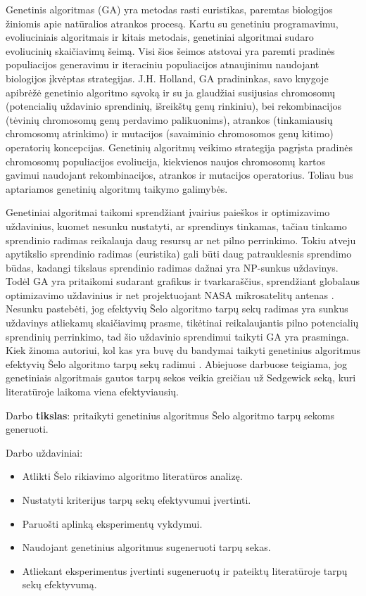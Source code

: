 \documentclass{VUMIFInfKursinis}
\begin{document}
Genetinis algoritmas (GA) yra metodas rasti euristikas, paremtas biologijos žiniomis apie natūralios atrankos procesą.
Kartu su genetiniu programavimu, evoliuciniais algoritmais ir kitais metodais, %
genetiniai algoritmai sudaro evoliucinių skaičiavimų šeimą.
Visi šios šeimos atstovai yra paremti pradinės populiacijos generavimu ir iteraciniu populiacijos atnaujinimu naudojant biologijos įkvėptas strategijas.
J.H. Holland, GA pradininkas, savo knygoje \cite{holland1992adaptation}
apibrėžė genetinio algoritmo sąvoką ir su ja glaudžiai susijusias
chromosomų (potencialių uždavinio sprendinių, išreikštų genų rinkiniu), bei
rekombinacijos (tėvinių chromosomų genų perdavimo palikuonims),
atrankos (tinkamiausių chromosomų atrinkimo) ir mutacijos (savaiminio chromosomos genų kitimo) operatorių koncepcijas.
Genetinių algoritmų veikimo strategija pagrįsta pradinės chromosomų populiacijos evoliucija, kiekvienos naujos chromosomų kartos
gavimui naudojant rekombinacijos, atrankos ir mutacijos operatorius.
Toliau bus aptariamos genetinių algoritmų taikymo galimybės.

Genetiniai algoritmai taikomi sprendžiant įvairius paieškos ir optimizavimo uždavinius, kuomet nesunku nustatyti, ar sprendinys tinkamas,
tačiau tinkamo sprendinio radimas reikalauja daug resursų ar net pilno perrinkimo.
Tokiu atveju apytikslio sprendinio radimas (euristika) gali būti daug patrauklesnis sprendimo būdas,
kadangi tikslaus sprendinio radimas dažnai yra NP-sunkus uždavinys.
Todėl GA yra pritaikomi sudarant grafikus ir tvarkaraščius,
sprendžiant globalaus optimizavimo uždavinius
ir net projektuojant NASA mikrosatelitų antenas \cite{hornby2006automated}.
Nesunku pastebėti, jog efektyvių Šelo algoritmo tarpų sekų radimas yra sunkus uždavinys atliekamų skaičiavimų prasme,
tikėtinai reikalaujantis pilno potencialių sprendinių perrinkimo,
tad šio uždavinio sprendimui taikyti GA yra prasminga.
Kiek žinoma autoriui, kol kas yra buvę du bandymai taikyti genetinius algoritmus efektyvių Šelo algoritmo tarpų sekų radimui \cite{simpson1999faster, roos2002genetic}.
Abiejuose darbuose teigiama, jog genetiniais algoritmais gautos tarpų sekos veikia greičiau už Sedgewick seką, kuri literatūroje laikoma viena efektyviausių.

\pagebreak

Darbo \textbf{tikslas}:
pritaikyti genetinius algoritmus Šelo algoritmo tarpų sekoms generuoti.

Darbo uždaviniai:
\begin{itemize}
  \item Atlikti Šelo rikiavimo algoritmo literatūros analizę.
  \item Nustatyti kriterijus tarpų sekų efektyvumui įvertinti.
  \item Paruošti aplinką eksperimentų vykdymui.
  \item Naudojant genetinius algoritmus sugeneruoti tarpų sekas.
  \item Atliekant eksperimentus įvertinti sugeneruotų ir pateiktų literatūroje tarpų sekų efektyvumą.
\end{itemize}
\end{document}
